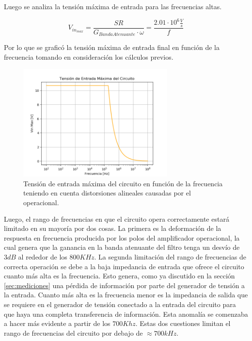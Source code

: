 Luego se analiza la tensión máxima de entrada para las frecuencias altas.

\begin{equation}
	V_{in_{max}} = \frac{SR}{G_{Banda Atenuante}\cdot \omega} = \frac{2.01\cdot 10^6\frac{V}{s}}{f}
\end{equation}

Por lo que se graficó la tensión máxima de entrada final en función de la frecuencia tomando en consideración los cálculos previos.

\begin{figure} [H]
	\centering
	\includegraphics[width=0.7\textwidth]{Imagenes/vin_max.PNG}
	\caption{Tensión de entrada máxima del circuito en función de la frecuencia teniendo en cuenta distorsiones alineales causadas por el operacional.}
	\label{fig:vin_max}
\end{figure}

Luego, el rango de frecuencias en que el circuito opera correctamente estará limitado en su mayoría por dos cosas. La primera es la deformación de la respuesta en frecuencia producida por los polos del amplificador operacional, la cual genera que la ganancia en la banda atenuante del filtro tenga un desvío de $3dB$ al rededor de los $800KHz$. La segunda limitación del rango de frecuencias de correcta operación se debe a la baja impedancia de entrada que ofrece el circuito cuanto más alta es la frecuencia. Esto genera, como ya discutido en la sección \ref{sec:mediciones} una pérdida de información por parte del generador de tensión a la entrada. Cuanto más alta es la frecuencia menor es la impedancia de salida que se requiere en el generador de tensión conectado a la entrada del circuito para que haya una completa transferencia de información. Esta anomalía se comenzaba a hacer más evidente a partir de los $700Khz$. Estas dos cuestiones limitan el rango de frecuencias del circuito por debajo de $\approx 700kHz$.


